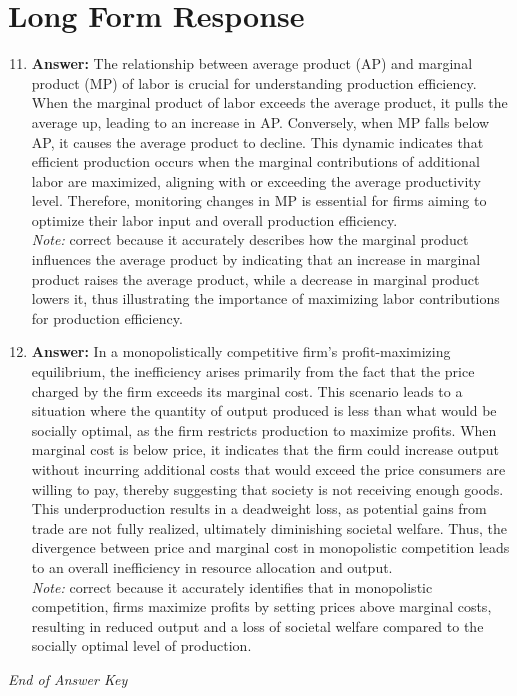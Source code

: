 \documentclass[12pt]{article}
\begin{document}
\section*{Long Form Response}
\begin{enumerate}[label=\arabic*.]
\setcounter{enumi}{10}
\item \textbf{Answer:} The relationship between average product (AP) and marginal product (MP) of labor is crucial for understanding production efficiency. When the marginal product of labor exceeds the average product, it pulls the average up, leading to an increase in AP. Conversely, when MP falls below AP, it causes the average product to decline. This dynamic indicates that efficient production occurs when the marginal contributions of additional labor are maximized, aligning with or exceeding the average productivity level. Therefore, monitoring changes in MP is essential for firms aiming to optimize their labor input and overall production efficiency.
\\ \textit{Note:} correct because it accurately describes how the marginal product influences the average product by indicating that an increase in marginal product raises the average product, while a decrease in marginal product lowers it, thus illustrating the importance of maximizing labor contributions for production efficiency.
\item \textbf{Answer:} In a monopolistically competitive firm's profit-maximizing equilibrium, the inefficiency arises primarily from the fact that the price charged by the firm exceeds its marginal cost. This scenario leads to a situation where the quantity of output produced is less than what would be socially optimal, as the firm restricts production to maximize profits. When marginal cost is below price, it indicates that the firm could increase output without incurring additional costs that would exceed the price consumers are willing to pay, thereby suggesting that society is not receiving enough goods. This underproduction results in a deadweight loss, as potential gains from trade are not fully realized, ultimately diminishing societal welfare. Thus, the divergence between price and marginal cost in monopolistic competition leads to an overall inefficiency in resource allocation and output.
\\ \textit{Note:} correct because it accurately identifies that in monopolistic competition, firms maximize profits by setting prices above marginal costs, resulting in reduced output and a loss of societal welfare compared to the socially optimal level of production.
\end{enumerate}

\vfill
\noindent\textit{End of Answer Key}
\end{document}
